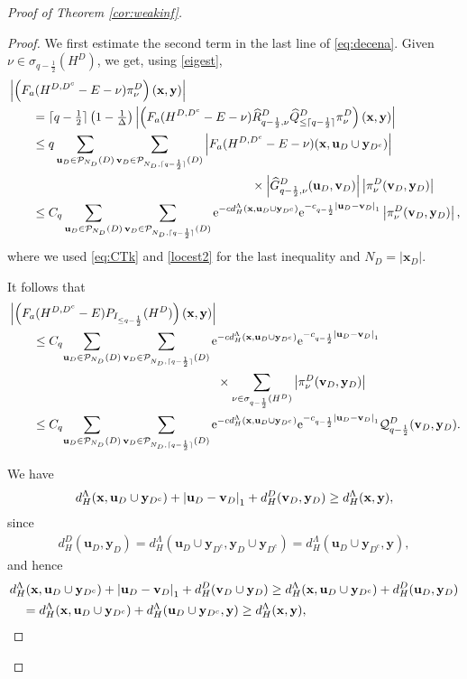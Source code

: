 \documentclass[12pt, a4paper,reqno]{amsart}
\numberwithin{equation}{section}
\newcommand\x{\mathbf{x}}
\newcommand\y{\mathbf{y}}
\renewcommand\u{\mathbf{u}}
\renewcommand\v{\mathbf{v}}
\newcommand\e{\mathrm{e}}
\newcommand\cQ{\mathcal{Q}}
\newcommand\cP{\mathcal{P}}
\newcommand\what{\widehat}
\newcommand\be{\begin{equation}\begin{aligned}}
\newcommand\ee{\end{aligned}\end{equation}}
\newcommand{\abs}[1]{\left\lvert #1 \right\rvert}
\newcommand{\pa}[1]{\left( #1 \right)}
\newcommand\La{\Lambda}
\newcommand{\eq}[1]{\eqref{#1}}
\newcommand{\tfd}{\pa{1- \tfrac{1}{\Delta}}}
\begin{document}
\begin{proof}[Proof of  Theorem \ref{cor:weakinf}]
\begin{proof}
We first estimate the second term in  the last line of \eq{eq:decena}. Given $\nu \in \sigma_{q-\frac12}(H^D)$, we get, using \eq{eigest},
\be
&\abs{\pa{F_{a}(H^{D,D^c}-E-\nu)\pi_{\nu}^D}(\x,\y)}\\
&\hspace{20pt}=\lceil q-\tfrac12\rceil\tfd  \abs{\pa{F_{a}(H^{D,D^c}-E-\nu) \what  R^{D}_{q-\frac12,\nu}\what Q^D_{\le \lceil  q-\frac12 \rceil} \pi_{\nu}^D}(\x,\y)}
\\ &\hspace{20pt}\le q\sum_{{\u_D}\in \cP_{N_D}(D)}\sum_{{\v_D}\in\cP_{{N_D},\lceil q-\frac12\rceil}(D)}\abs{F_{a}(H^{D,D^c}-E-\nu)({\bf x},\u_D \cup\y_{D^c})}\\&\hspace{7cm}\times\abs{\what  G^{D}_{ q-\frac12,\nu}(\u_D,\v_D)}\abs{\pi^D_{\nu}(\v_D,\y_D)}\\& \hspace{20pt}\le C_q\sum_{{\u_D}\in \cP_{N_D}(D)}\sum_{{\v_D}\in\cP_{{N_D},\lceil q-\frac12\rceil}(D)} \e^{-c d_H^{  \La } \pa{{\bf x},\u_D \cup\y_{D^c}}}\e^{-c_{q-\frac 1 2}\abs{{\u_D}-{\v_D}}_1}\abs{\pi^D_{\nu}(\v_D,\y_D)},
\ee
where we used   \eqref{eq:CTk} and \eqref{locest2} for the last  inequality  and   $N_D= \abs{\x_D}$.


It follows that 
\be\label{FHDDEP}
&\abs{\pa{F_{a}(H^{D,D^c}-E)P_{I_{\le q-\frac12}}(H^{D})}({\bf x},{\bf y})}\\ & \hspace{20pt} \le  
C_q {\sum_{{\u_D}\in \cP_{N_D}(D)}\sum_{{\v_D}\in\cP_{{N_D},\lceil q-\frac12\rceil}(D)} \e^{-c d_H^{  \La } {({\bf x},\u_D \cup\y_{D^c})}}\e^{-c_{q-\frac 1 2}\abs{{\u_D}-{\v_D}}_1}}\\&\hspace{6cm}\times\sum_{\nu \in \sigma_{q-\frac12}(H^D)}\abs{\pi^D_{\nu}(\v_D,\y_D)}\\ & \hspace{20pt}  \le  
C_q {\sum_{{\u_D}\in \cP_{N_D}(D)}\sum_{{\v_D}\in\cP_{{N_D},\lceil q-\frac12\rceil}(D)} \e^{-c d_H^{  \La } {({\bf x},\u_D \cup\y_{D^c})}}\e^{-c_{q-\frac 1 2}\abs{{\u_D}-{\v_D}}_1}} \cQ^D_{q-\frac 12}(\v_D,\y_D).
\ee 


We have
\be\label{dHxyu}
d_H^{  \La } ({\bf x},\u_D \cup\y_{D^c}) +\abs{{\u_D}-{\v_D}}_1+d_H^D (\v_D,\y_D)  \ge d_H^{  \La }(\x,\y),
\ee
since
\be
d_H^D (\u_D,\y_D) =   d_H^\La (\u_D \cup\y_{D^c}, \y_D \cup \y_{D^c})=  d_H^\La (\u_D \cup\y_{D^c}, \y) ,
\ee
and hence
\be
&d_H^{  \La } ({\bf x},\u_D \cup\y_{D^c} )+\abs{{\u_D}-{\v_D}}_1+d_H^D (\v_D \cup \y_D)  \ge d_H^{  \La } ({\bf x},\u_D \cup\y_{D^c} ) + d_H^D (\u_D,\y_D)\\
& \quad =  d_H^{  \La } ({\bf x},\u_D \cup\y_{D^c} ) +   d_H^\La (\u_D \cup\y_{D^c}, \y) \ge    d_H^{  \La }(\x,\y),
\ee



\end{proof}
\end{proof}
\end{document}
